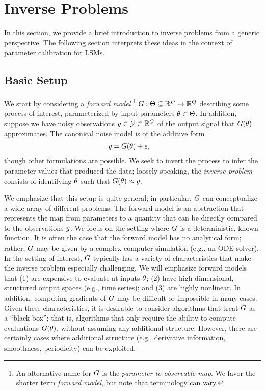 \documentclass[12pt]{article}
\begin{document}
\section{Inverse Problems}
In this section, we provide a brief introduction to inverse problems from a generic perspective. The following section 
interprets these ideas in the context of parameter calibration for LSMs. 

\subsection{Basic Setup}
We start by considering a \textit{forward model} 
\footnote{An alternative name for $G$ is the \textit{parameter-to-observable map}. We favor the shorter term 
\textit{forward model}, but note that terminology can vary.}
$G: \Theta \subseteq \mathbb{R}^{D} \to \mathbb{R}^{Q}$ describing some 
process of interest, parameterized by input parameters $\theta \in \Theta$. In addition, suppose we have noisy 
observations $y \in \mathcal{Y} \subset \mathbb{R}^{Q}$ of the output signal that $G(\theta)$ approximates. 
The canonical noise model is of the additive form 
\begin{align}
y &= G(\theta) + \epsilon,
\end{align}
though other formulations are possible. 
We seek to invert the process to infer the parameter values that produced the data; loosely speaking, the 
\textit{inverse problem} consists of identifying $\theta$ such that $G(\theta) \approx y$. 

We emphasize that this setup is quite general; in particular, $G$ can conceptualize a wide array 
of different problems. The forward model is an abstraction that represents the map from parameters to a quantity that
can be directly compared to the observations $y$. We focus on the setting where $G$ is a deterministic, known 
function. It is often the case that the forward model has no analytical form; rather, $G$ may be given by a complex 
computer simulation (e.g., an ODE solver). 
In the setting of interest, $G$ typically has a variety of characteristics that make 
the inverse problem especially challenging. We will emphasize forward models that (1) are expensive to evaluate 
at inputs $\theta$; (2) have high-dimensional, structured output spaces (e.g., time series); and (3) are highly nonlinear. 
In addition, computing gradients of $G$ may be difficult or impossible in many cases. Given these characteristics, 
it is desirable to consider algorithms that treat $G$ as a ``black-box''; that is, algorithms that only require the 
ability to compute evaluations $G(\theta)$, without assuming any additional structure. However, there are certainly 
cases where additional structure (e.g., derivative information, smoothness, periodicity) can be exploited. 
\end{document}
